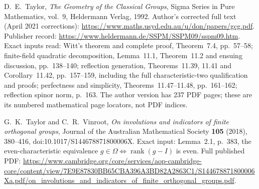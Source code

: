D.~E.~Taylor, \emph{The Geometry of the Classical Groups},
Sigma Series in Pure Mathematics, vol.~9, Heldermann Verlag, 1992.
Author's corrected full text (April 2021 corrections):
\url{https://www.maths.usyd.edu.au/u/don/papers/gcg.pdf}.
Publisher record:
\url{https://www.heldermann.de/SSPM/SSPM09/sspm09.htm}.
Exact inputs read: Witt's theorem and complete proof,
Theorem~7.4, pp.~57--58; finite-field quadratic decomposition,
Lemma~11.1, Theorem~11.2 and ensuing discussion, pp.~138--140;
reflection generation, Theorems~11.39, 11.41 and
Corollary~11.42, pp.~157--159, including the full characteristic-two
qualification and proofs; perfectness and simplicity,
Theorems~11.47--11.48, pp.~161--162; reflection spinor norm, p.~163.
The author version has 237 PDF pages; these are its numbered
mathematical page locators, not PDF indices.

G.~K.~Taylor and C.~R.~Vinroot,
\emph{On involutions and indicators of finite orthogonal groups},
Journal of the Australian Mathematical Society \textbf{105} (2018),
380--416, doi:10.1017/S144678871800006X.
Exact input: Lemma~2.1, p.~383, the even-characteristic equivalence
$g\in\Omega\Longleftrightarrow\operatorname{rank}(g-I)$ is even.
Full published PDF:
\url{https://www.cambridge.org/core/services/aop-cambridge-core/content/view/7E9E87830BB65CBA396A3BD82A2863C1/S144678871800006Xa.pdf/on_involutions_and_indicators_of_finite_orthogonal_groups.pdf}.

